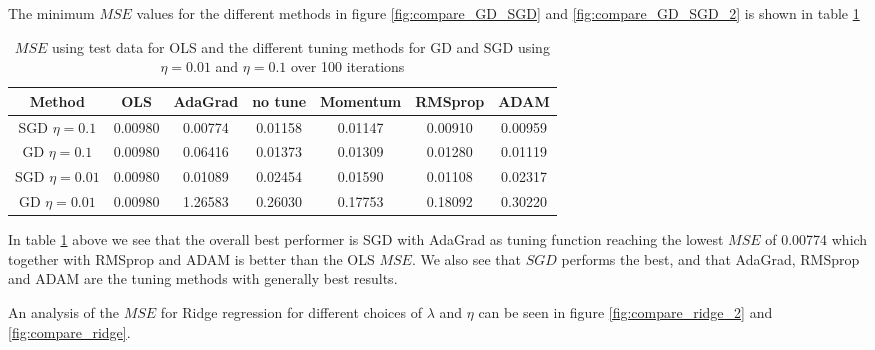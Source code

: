\documentclass[11pt]{article}
\begin{document}
The minimum $MSE$ values for the different methods in figure \ref{fig:compare_GD_SGD} and \ref{fig:compare_GD_SGD_2} is shown in table \ref{tab:OLS_compare}
\begin{table}[H]
    \centering
    \caption{$MSE$ using test data for OLS and the different tuning methods for GD and SGD using  $\eta=0.01$ and $\eta=0.1$ over 100 iterations}
    \label{tab:OLS_compare}
    \begin{tabular}{|c|c|c|c|c|c|c|}
        \hline
        Method          & OLS     & AdaGrad & no tune & Momentum & RMSprop & ADAM    \\
        \hline
        SGD $\eta=0.1$  & 0.00980 & 0.00774 & 0.01158 & 0.01147  & 0.00910 & 0.00959 \\
        \hline
        GD  $\eta=0.1$  & 0.00980 & 0.06416 & 0.01373 & 0.01309  & 0.01280 & 0.01119 \\
        \hline
        SGD $\eta=0.01$ & 0.00980 & 0.01089 & 0.02454 & 0.01590  & 0.01108 & 0.02317 \\
        \hline
        GD  $\eta=0.01$ & 0.00980 & 1.26583 & 0.26030 & 0.17753  & 0.18092 & 0.30220 \\
        \hline
    \end{tabular}
\end{table}
In table \ref{tab:OLS_compare} above we see that the overall best performer is SGD with AdaGrad as tuning function reaching the lowest $MSE$ of 0.00774 which together with RMSprop and ADAM is better than the OLS $MSE$. We also see that $SGD$ performs the best, and that AdaGrad, RMSprop and ADAM are the tuning methods with generally best results.

An analysis of the $MSE$ for Ridge regression for different choices of $\lambda$ and $\eta$ can be seen in figure  \ref{fig:compare_ridge_2} and \ref{fig:compare_ridge}.
\end{document}
